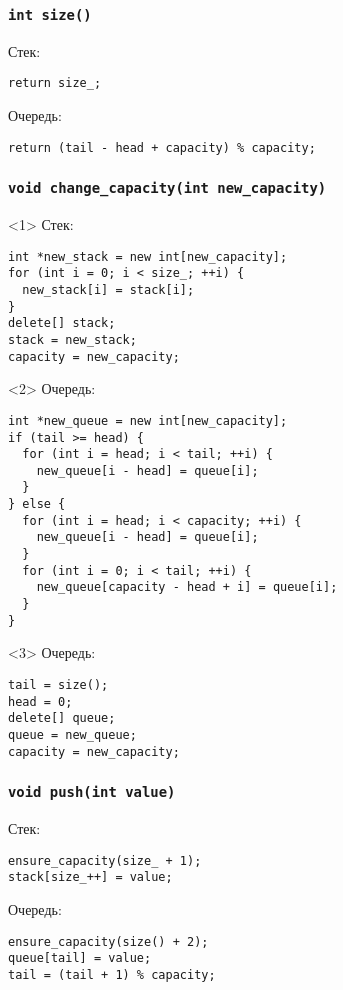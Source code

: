 \documentclass[pdf,russian,aspectratio=169]{beamer}
\begin{document}
\begin{frame}[fragile]
  \frametitle{\texttt{int size()}}
  Стек:
  \begin{verbatim}
return size_;
  \end{verbatim}
  \pause
  \vspace{1em}
  Очередь:
  \begin{verbatim}
return (tail - head + capacity) % capacity;
  \end{verbatim}
\end{frame}

\begin{frame}[fragile,t]
  \frametitle{\texttt{void change_capacity(int new_capacity)}}
  \begin{onlyenv}<1>
    Стек:
    \begin{verbatim}
int *new_stack = new int[new_capacity];
for (int i = 0; i < size_; ++i) {
  new_stack[i] = stack[i];
}
delete[] stack;
stack = new_stack;
capacity = new_capacity;
    \end{verbatim}
  \end{onlyenv}
  \begin{onlyenv}<2>
    Очередь:
    \begin{verbatim}
int *new_queue = new int[new_capacity];
if (tail >= head) {
  for (int i = head; i < tail; ++i) {
    new_queue[i - head] = queue[i];
  }
} else {
  for (int i = head; i < capacity; ++i) {
    new_queue[i - head] = queue[i];
  }
  for (int i = 0; i < tail; ++i) {
    new_queue[capacity - head + i] = queue[i];
  }
}
    \end{verbatim}
  \end{onlyenv}
  \begin{onlyenv}<3>
    Очередь:
    \begin{verbatim}
tail = size();
head = 0;
delete[] queue;
queue = new_queue;
capacity = new_capacity;
    \end{verbatim}
  \end{onlyenv}
\end{frame}

\begin{frame}[fragile]
  \frametitle{\texttt{void push(int value)}}
  Стек:
  \begin{verbatim}
ensure_capacity(size_ + 1);
stack[size_++] = value;
  \end{verbatim}
  \pause
  \vspace{1em}
  Очередь:
  \begin{verbatim}
ensure_capacity(size() + 2);
queue[tail] = value;
tail = (tail + 1) % capacity;
  \end{verbatim}
\end{frame}
\end{document}
